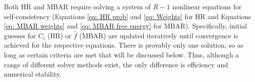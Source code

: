 \documentclass[journal=jced,manuscript=article]{achemso}
\newcommand{\bfv}[1]{{\mbox{\boldmath{$#1$}}}}
\newcommand{\x}{\bfv{x}}
\begin{document}


Both HR and MBAR require solving a system of $R-1$ nonlinear equations for self-consistency (Equations \ref{eq: HR prob} and \ref{eq: Weights} for HR and Equations \ref{eq: MBAR weights} and \ref{eq: MBAR free energy} for MBAR). Specifically, initial guesses for $C_i$ (HR) or $\hat f$ (MBAR) are updated iteratively until convergence is achieved for the respective equations. There is provably only one solution, so as long as certain criteria are met that will be discussed below. Thus, although a range of different solver methods exist, the only difference is efficiency and numerical stability.

\end{document}
